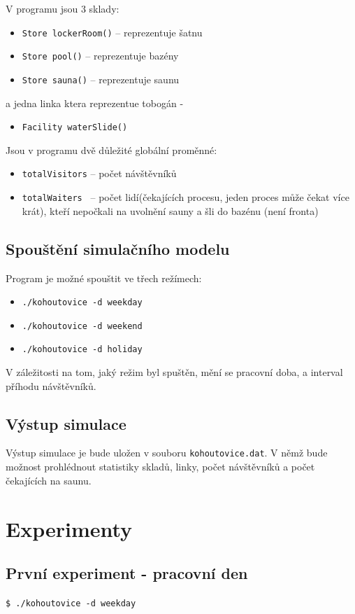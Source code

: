 \documentclass[a4paper, 11pt]{article}
\begin{document}
    V programu jsou 3 sklady:
    \begin{itemize}
    \item \verb|Store lockerRoom()| -- reprezentuje šatnu
    \item \verb|Store pool()| -- reprezentuje bazény
    \item \verb|Store sauna()|  -- reprezentuje saunu 
    \end{itemize}
    a jedna linka ktera reprezentue tobogán - 
    \begin{itemize}
    \item \verb|Facility waterSlide()|
    \end{itemize}
    Jsou v programu dvě důležité globální proměnné:
    \begin{itemize}
    \item \verb|totalVisitors| -- počet návštěvníků 
    \item \verb|totalWaiters | -- počet lidí(čekajících procesu, jeden proces může čekat více krát), kteří nepočkali na uvolnění sauny a šli do bazénu (není fronta)
    \end{itemize}

    \subsection{Spouštění simulačního modelu}
    Program je možné spouštit ve třech režímech:
    \begin{itemize}
    \item \verb|./kohoutovice -d weekday|
    \item \verb|./kohoutovice -d weekend|
    \item \verb|./kohoutovice -d holiday| 
    \end{itemize}
    V záležitosti na tom, jaký režim byl spuštěn, mění se pracovní doba, a interval příhodu návštěvníků. 

    \subsection{Výstup simulace}
    Výstup simulace je bude uložen v souboru \verb|kohoutovice.dat|. V němž bude možnost prohlédnout statistiky skladů, linky, počet návštěvníků a počet čekajících na saunu.
    
    \section{Experimenty}
    \subsection {První experiment - pracovní den}
    \verb|$ ./kohoutovice -d weekday| 
\end{document}
